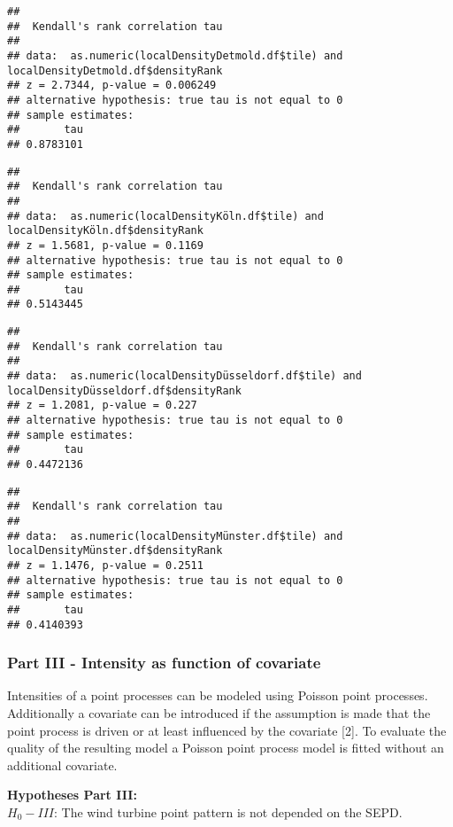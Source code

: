 \documentclass[
]{article}
\begin{document}
\begin{verbatim}
## 
##  Kendall's rank correlation tau
## 
## data:  as.numeric(localDensityDetmold.df$tile) and localDensityDetmold.df$densityRank
## z = 2.7344, p-value = 0.006249
## alternative hypothesis: true tau is not equal to 0
## sample estimates:
##       tau 
## 0.8783101
\end{verbatim}

\begin{verbatim}
## 
##  Kendall's rank correlation tau
## 
## data:  as.numeric(localDensityKöln.df$tile) and localDensityKöln.df$densityRank
## z = 1.5681, p-value = 0.1169
## alternative hypothesis: true tau is not equal to 0
## sample estimates:
##       tau 
## 0.5143445
\end{verbatim}

\begin{verbatim}
## 
##  Kendall's rank correlation tau
## 
## data:  as.numeric(localDensityDüsseldorf.df$tile) and localDensityDüsseldorf.df$densityRank
## z = 1.2081, p-value = 0.227
## alternative hypothesis: true tau is not equal to 0
## sample estimates:
##       tau 
## 0.4472136
\end{verbatim}

\begin{verbatim}
## 
##  Kendall's rank correlation tau
## 
## data:  as.numeric(localDensityMünster.df$tile) and localDensityMünster.df$densityRank
## z = 1.1476, p-value = 0.2511
## alternative hypothesis: true tau is not equal to 0
## sample estimates:
##       tau 
## 0.4140393
\end{verbatim}

\hypertarget{part-iii---intensity-as-function-of-covariate}{%
\subsubsection{Part III - Intensity as function of
covariate}\label{part-iii---intensity-as-function-of-covariate}}

Intensities of a point processes can be modeled using Poisson point
processes. Additionally a covariate can be introduced if the assumption
is made that the point process is driven or at least influenced by the
covariate {[}2{]}. To evaluate the quality of the resulting model a
Poisson point process model is fitted without an additional covariate.

\textbf{Hypotheses Part III:}\\
\(H_{0} - III\): The wind turbine point pattern is not depended on the
SEPD.\\
\end{document}
